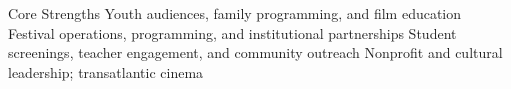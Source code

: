 \begin{rubric}{Core Strengths}
\AdeNoentry
\entry*[]%
Youth audiences, family programming, and film education
\entry*[]%
Festival operations, programming, and institutional partnerships
\entry*[]%
Student screenings, teacher engagement, and community outreach
\entry*[]%
Nonprofit and cultural leadership; transatlantic cinema
\end{rubric}
